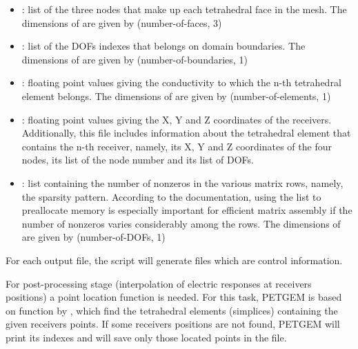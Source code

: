 \documentclass[letterpaper,10pt,english]{sphinxmanual}
\begin{document}
\begin{itemize}
\item {} 
: list of the three nodes that make up each tetrahedral face in the mesh. The dimensions of  are given by (number-of-faces, 3)

\item {} 
: list of the DOFs indexes that belongs on domain boundaries. The dimensions of  are given by (number-of-boundaries, 1)

\item {} 
: floating point values giving the conductivity to which the n-th tetrahedral element belongs. The dimensions of  are given by (number-of-elements, 1)

\item {} 
: floating point values giving the X, Y and Z coordinates of the receivers. Additionally, this file includes information about the tetrahedral element that contains the n-th receiver, namely, its X, Y and Z coordinates of the four nodes, its list of the node number and its list of DOFs.

\item {} 
: list containing the number of nonzeros in the various matrix rows, namely, the sparsity pattern. According to the  documentation, using the  list to preallocate memory is especially important for efficient matrix assembly if the number of nonzeros varies considerably among the rows. The dimensions of  are given by (number-of-DOFs, 1)

\end{itemize}

For each  output file, the  script will
generate  files which are 
control information.

For post-processing stage (interpolation of electric responses at receivers
positions) a point location function is needed. For this task, PETGEM is based
on  function by , which
find the tetrahedral elements (simplices) containing the given receivers
points. If some receivers positions are not found, PETGEM will print its
indexes and will save only those located points in the 
file.
\end{document}
